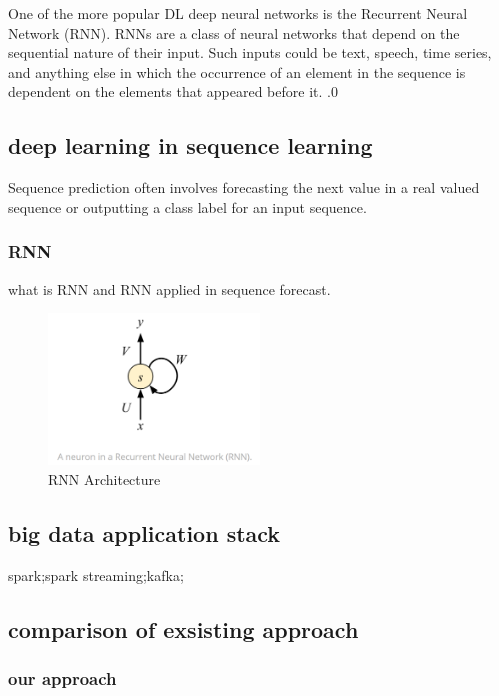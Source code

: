 \documentclass[review]{elsarticle}
\begin{document}
One of the more popular DL deep neural networks is the Recurrent Neural Network (RNN). RNNs are a class of neural networks that depend on the sequential nature of their input. Such inputs could be text, speech, time series, and anything else in which the occurrence of an element in the sequence is dependent on the elements that appeared before it. .0

\subsection{deep learning in sequence learning}
Sequence prediction often involves forecasting the next value in a real valued sequence or outputting a class label for an input sequence.
\
\subsubsection{RNN}
\cite{Bengio1994LearningDifficult}
\cite{ChoLearningTranslation}

what is RNN and RNN applied in sequence forecast.

\begin{figure}[h]
    \centering
    \includegraphics[width=0.5\textwidth]{RNN.png}
    \caption{RNN Architecture}
    \label{fig:RNN}
\end{figure}



\subsection{big data application stack}
spark\cite{ZahariaSpark:Sets};spark streaming\cite{ZahariaDiscretizedClusters};kafka;
\subsection{comparison of exsisting approach}


\subsubsection{our approach}
\end{document}
